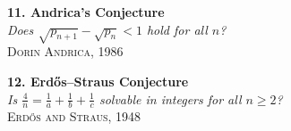 \begin{center}
\begin{tcolorbox}[
    colback=gray!2,
    colframe=gray!60,
    boxrule=0.4pt,
    width=\textwidth,
    arc=1pt,
    left=6pt,
    right=6pt,
    top=6pt,
    bottom=6pt,
    shadow={0mm}{-0.5mm}{0mm}{gray!40}
  ]
  \vspace{2em}

  \noindent\begin{minipage}{0.44\textwidth}
    \textbf{11. Andrica's Conjecture}\\
    \emph{Does \(\sqrt{p_{n+1}} - \sqrt{p_n} < 1\) hold for all \(n\)?}\\
    \hfill\textsc{Dorin Andrica, 1986}
  \end{minipage}\hfill
  \begin{minipage}{0.44\textwidth}
    \textbf{12. Erdős–Straus Conjecture}\\
    \emph{Is \(\tfrac{4}{n} = \tfrac{1}{a} + \tfrac{1}{b} + \tfrac{1}{c}\) solvable in integers for all \(n\ge2\)?}\\
    \hfill\textsc{Erdős and Straus, 1948}
  \end{minipage}

  \end{tcolorbox}
\end{center}


\thispagestyle{empty}
\begin{figure}[p]
\centering
{}
\end{figure}


